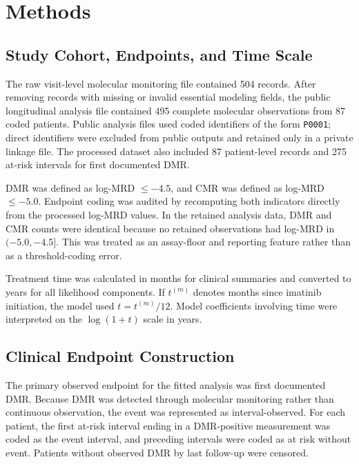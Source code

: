 \documentclass[11pt]{article}
\begin{document}
\section{Methods}

\subsection{Study Cohort, Endpoints, and Time Scale}

The raw visit-level molecular monitoring file contained 504 records. After removing records with missing or invalid essential modeling fields, the public longitudinal analysis file contained 495 complete molecular observations from 87 coded patients. Public analysis files used coded identifiers of the form \texttt{P0001}; direct identifiers were excluded from public outputs and retained only in a private linkage file. The processed dataset also included 87 patient-level records and 275 at-risk intervals for first documented DMR.

DMR was defined as log-MRD \(\le -4.5\), and CMR was defined as log-MRD \(\le -5.0\). Endpoint coding was audited by recomputing both indicators directly from the processed log-MRD values. In the retained analysis data, DMR and CMR counts were identical because no retained observations had log-MRD in \((-5.0,-4.5]\). This was treated as an assay-floor and reporting feature rather than as a threshold-coding error.

Treatment time was calculated in months for clinical summaries and converted to years for all likelihood components. If \(t^{(m)}\) denotes months since imatinib initiation, the model used \(t=t^{(m)}/12\). Model coefficients involving time were interpreted on the \(\log(1+t)\) scale in years.



\subsection{Clinical Endpoint Construction}

The primary observed endpoint for the fitted analysis was first documented DMR. Because DMR was detected through molecular monitoring rather than continuous observation, the event was represented as interval-observed. For each patient, the first at-risk interval ending in a DMR-positive measurement was coded as the event interval, and preceding intervals were coded as at risk without event. Patients without observed DMR by last follow-up were censored.
\end{document}
